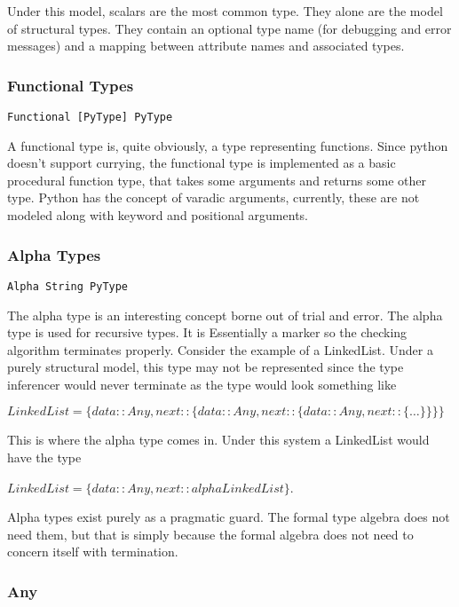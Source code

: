 \documentclass{scrartcl}
\begin{document}
\begin{multicols}{2}
Under this model, scalars are the most common type. They alone are
the model of structural types. They contain an optional type name
(for debugging and error messages) and a mapping between attribute
names and associated types.

\subsubsection*{Functional Types}

\texttt{Functional [PyType] PyType}

A functional type is, quite obviously, a type representing functions.
Since python doesn't support currying, the functional type is implemented
as a basic procedural function type, that takes some arguments and returns
some other type. Python has the concept of varadic arguments, currently,
these are not modeled along with keyword and positional arguments.

\subsubsection*{Alpha Types}

\texttt{Alpha String PyType}

The alpha type is an interesting concept borne out of trial and error. The
alpha type is used for recursive types. It is Essentially a marker so
the checking algorithm terminates properly. Consider the example of
a LinkedList. Under a purely structural model, this type may not be represented
since the type inferencer would never terminate as the type
would look something like

\vspace{0.2cm}
$LinkedList = \{data::Any,next::\{data::Any,next::\{data::Any,next::\{\ldots\}\}\}\}$
\vspace{0.2cm}

This is where the alpha type comes in. Under this system
a LinkedList would have the type

\vspace{0.2cm}
$LinkedList = \{data::Any,next::alpha LinkedList\}$.
\vspace{0.2cm}

Alpha types exist purely as a pragmatic guard. The formal type algebra does
not need them, but that is simply because the formal algebra does not need
to concern itself with termination.

\subsubsection*{Any}


\end{multicols}
\end{document}
